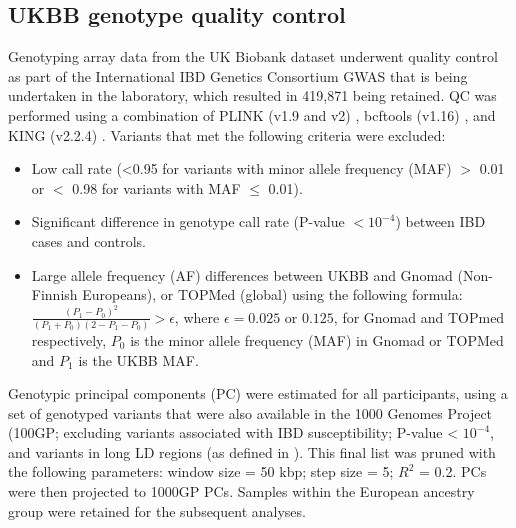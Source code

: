 \subsection{UKBB genotype quality control}
Genotyping array data from the UK Biobank dataset underwent quality control as part of the International IBD Genetics Consortium GWAS that is being undertaken in the laboratory, which resulted in 419,871 being retained. QC was performed using a combination of PLINK (v1.9 and v2) \cite{Purcell2007-mu}, bcftools (v1.16) \cite{Li2011-td}, and KING (v2.2.4) \cite{king-software}.  Variants that met the following criteria were excluded: 
\begin{itemize}
  \item Low call rate (<0.95 for variants with minor allele frequency (MAF) $>$ 0.01 or $<$ 0.98 for variants with MAF $\leq$ 0.01).
  \item Significant difference in genotype call rate (P-value $< 10^{-4}$) between IBD cases and controls.
  \item Large allele frequency (AF) differences between UKBB and Gnomad (Non-Finnish Europeans), or TOPMed (global) using the following formula: $\frac{(P_{1}-P_{0})^{2}}{(P_{1}+P_{0})(2-P_{1}-P_{0})} > \epsilon$, where $\epsilon=0.025$ or $0.125$, for Gnomad and TOPmed respectively,  $P_{0}$ is the minor allele frequency (MAF) in Gnomad or TOPMed and $P_{1}$ is the UKBB MAF. 
\end{itemize}

Genotypic principal components (PC) were estimated for all participants, using a set of genotyped variants that were also available in the 1000 Genomes Project (100GP; excluding variants associated with IBD susceptibility; P-value < $10^{-4}$, and variants in long LD regions (as defined in \cite{plink_high_ld}). This final list was pruned with the following parameters: window size = 50 kbp; step size = 5; $R^{2}$ = 0.2. PCs were then projected to 1000GP PCs. Samples within the European ancestry group were retained for the subsequent analyses. 



